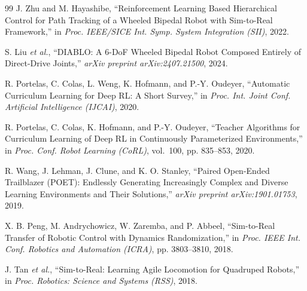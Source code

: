 \documentclass[conference]{IEEEtran}
\begin{document}
\begin{thebibliography}{99}
J. Zhu and M. Hayashibe,
``Reinforcement Learning Based Hierarchical Control for Path Tracking of a
Wheeled Bipedal Robot with Sim-to-Real Framework,''
in \emph{Proc. IEEE/SICE Int. Symp. System Integration (SII)}, 2022.

S. Liu \emph{et al.},
``DIABLO: A 6-DoF Wheeled Bipedal Robot Composed Entirely of Direct-Drive Joints,''
\emph{arXiv preprint arXiv:2407.21500}, 2024.

R. Portelas, C. Colas, L. Weng, K. Hofmann, and P.-Y. Oudeyer,
``Automatic Curriculum Learning for Deep RL: A Short Survey,''
in \emph{Proc. Int. Joint Conf. Artificial Intelligence (IJCAI)}, 2020.

R. Portelas, C. Colas, K. Hofmann, and P.-Y. Oudeyer,
``Teacher Algorithms for Curriculum Learning of Deep RL in Continuously
Parameterized Environments,''
in \emph{Proc. Conf. Robot Learning (CoRL)}, vol.~100, pp. 835--853, 2020.

R. Wang, J. Lehman, J. Clune, and K. O. Stanley,
``Paired Open-Ended Trailblazer (POET): Endlessly Generating Increasingly
Complex and Diverse Learning Environments and Their Solutions,''
\emph{arXiv preprint arXiv:1901.01753}, 2019.

X. B. Peng, M. Andrychowicz, W. Zaremba, and P. Abbeel,
``Sim-to-Real Transfer of Robotic Control with Dynamics Randomization,''
in \emph{Proc. IEEE Int. Conf. Robotics and Automation (ICRA)},
pp. 3803--3810, 2018.

J. Tan \emph{et al.},
``Sim-to-Real: Learning Agile Locomotion for Quadruped Robots,''
in \emph{Proc. Robotics: Science and Systems (RSS)}, 2018.

\end{thebibliography}
\end{document}

